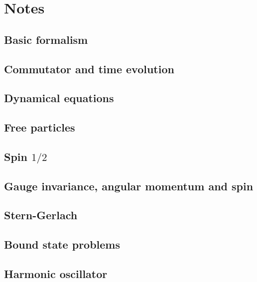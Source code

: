 \part{Notes}
   \chapter{Basic formalism}
      

   \chapter{Commutator and time evolution}
      
      
      
      

   \chapter{Dynamical equations}
      

   \chapter{Free particles}
      

   \chapter{Spin $1/2$}
      

   \chapter{Gauge invariance, angular momentum and spin}
      

   \chapter{Stern-Gerlach}
   \chapter{Bound state problems}
   \chapter{Harmonic oscillator}
      

